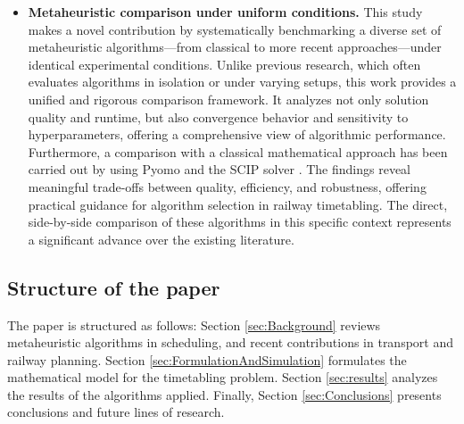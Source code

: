 \documentclass[Afour,sagev,times]{sagej}
\begin{document}
\begin{itemize}

  \item \textbf{Metaheuristic comparison under uniform conditions.} This study makes a novel contribution by systematically benchmarking a diverse set of metaheuristic algorithms—from classical to more recent approaches—under identical experimental conditions. Unlike previous research, which often evaluates algorithms in isolation or under varying setups, this work provides a unified and rigorous comparison framework. It analyzes not only solution quality and runtime, but also convergence behavior and sensitivity to hyperparameters, offering a comprehensive view of algorithmic performance. Furthermore, a comparison with a classical mathematical approach has been carried out by using Pyomo \cite{hart2011pyomo} and the \gls{SCIP} solver \cite{scip}. The findings reveal meaningful trade-offs between quality, efficiency, and robustness, offering practical guidance for algorithm selection in railway timetabling. The direct, side-by-side comparison of these algorithms in this specific context represents a significant advance over the existing literature.

\end{itemize}

\subsection{Structure of the paper}
The paper is structured as follows: Section \ref{sec:Background} reviews metaheuristic algorithms in scheduling, and recent contributions in transport and railway planning. Section \ref{sec:FormulationAndSimulation} formulates the mathematical model for the timetabling problem. Section \ref{sec:results} analyzes the results of the algorithms applied. Finally, Section \ref{sec:Conclusions} presents conclusions and future lines of research.
\end{document}

